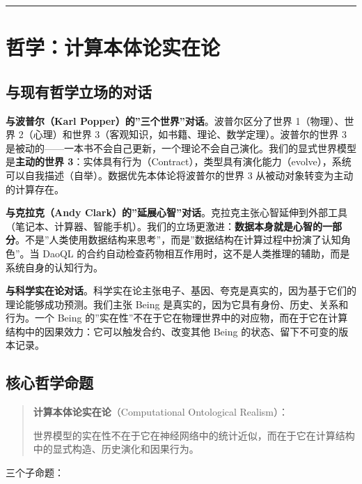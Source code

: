 \documentclass[11pt,a4paper]{ctexart}
\begin{document}
\begin{center}\rule{0.5\linewidth}{0.5pt}\end{center}

\section{哲学：计算本体论实在论}\label{ux54f2ux5b66ux8ba1ux7b97ux672cux4f53ux8bbaux5b9eux5728ux8bba}

\subsection{与现有哲学立场的对话}\label{ux4e0eux73b0ux6709ux54f2ux5b66ux7acbux573aux7684ux5bf9ux8bdd}

\textbf{与波普尔（Karl Popper）的''三个世界''对话}。波普尔区分了世界
1（物理）、世界 2（心理）和世界
3（客观知识，如书籍、理论、数学定理）。波普尔的世界 3
是被动的------一本书不会自己更新，一个理论不会自己演化。我们的显式世界模型是\textbf{主动的世界
3}：实体具有行为（Contract），类型具有演化能力（evolve），系统可以自我描述（自举）。数据优先本体论将波普尔的世界
3 从被动对象转变为主动的计算存在。

\textbf{与克拉克（Andy
Clark）的''延展心智''对话}。克拉克主张心智延伸到外部工具（笔记本、计算器、智能手机）。我们的立场更激进：\textbf{数据本身就是心智的一部分}。不是''人类使用数据结构来思考''，而是''数据结构在计算过程中扮演了认知角色''。当
DaoQL
的合约自动检查药物相互作用时，这不是人类推理的辅助，而是系统自身的认知行为。

\textbf{与科学实在论对话}。科学实在论主张电子、基因、夸克是真实的，因为基于它们的理论能够成功预测。我们主张
Being 是真实的，因为它具有身份、历史、关系和行为。一个 Being
的''实在性''不在于它在物理世界中的对应物，而在于它在计算结构中的因果效力：它可以触发合约、改变其他
Being 的状态、留下不可变的版本记录。

\subsection{核心哲学命题}\label{ux6838ux5fc3ux54f2ux5b66ux547dux9898}

\begin{quote}
\textbf{计算本体论实在论}（Computational Ontological Realism）：

世界模型的实在性不在于它在神经网络中的统计近似，而在于它在计算结构中的显式构造、历史演化和因果行为。
\end{quote}

三个子命题：
\end{document}
